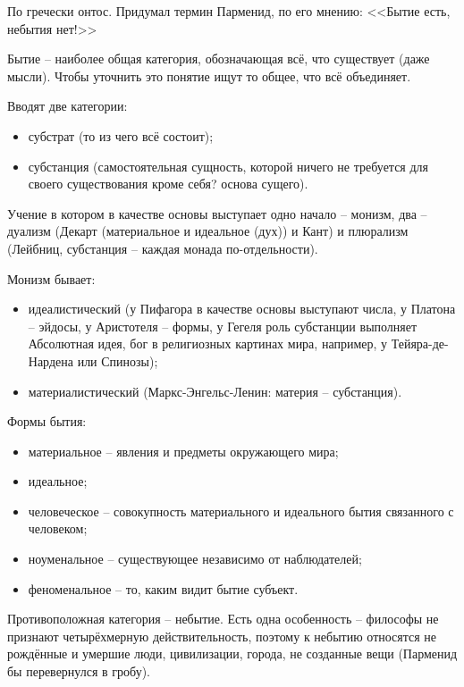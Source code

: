 
По гречески онтос. Придумал термин Парменид, по его мнению: <<Бытие есть, небытия нет!>>

Бытие -- наиболее общая категория, обозначающая всё, что существует (даже мысли). Чтобы уточнить это понятие ищут то общее, что всё объединяет.

Вводят две категории: 
\begin{itemize}
	\item субстрат (то из чего всё состоит);
	\item субстанция (самостоятельная сущность, которой ничего не требуется для своего существования кроме себя? основа сущего).
\end{itemize}

Учение в котором в качестве основы выступает одно начало -- монизм, два -- дуализм (Декарт (материальное и идеальное (дух)) и Кант) и плюрализм (Лейбниц, субстанция -- каждая монада по-отдельности).

Монизм бывает:
\begin{itemize}
	\item идеалистический (у Пифагора в качестве основы выступают числа, у Платона -- эйдосы, у Аристотеля -- формы, у Гегеля роль субстанции выполняет Абсолютная идея, бог в религиозных картинах мира, например, у Тейяра-де-Нардена или Спинозы);
	\item материалистический (Маркс-Энгельс-Ленин: материя -- субстанция).
\end{itemize}

Формы бытия:
\begin{itemize}
	\item материальное -- явления и предметы окружающего мира;
	\item идеальное;
	\item человеческое -- совокупность материального и идеального бытия связанного с человеком;
	\item ноуменальное -- существующее независимо от наблюдателей;
	\item феноменальное -- то, каким видит бытие субъект. 
\end{itemize}

Противоположная категория -- небытие. Есть одна особенность -- философы не признают четырёхмерную действительность, поэтому к небытию относятся не рождённые и умершие люди, цивилизации, города, не созданные вещи (Парменид бы перевернулся в гробу).